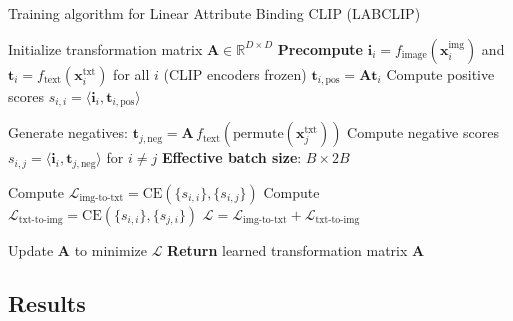 \begin{algorithm}
\small 
\caption{\small Training algorithm for Linear Attribute Binding CLIP (LABCLIP)}
\begin{algorithmic}[1]
\State Initialize transformation matrix $\mathbf{A} \in \mathbb{R}^{D \times D}$
\State \textbf{Precompute} $\mathbf{i}_i = f_{\text{image}}(\mathbf{x}_i^{\text{img}})$ and $\mathbf{t}_i = f_{\text{text}}(\mathbf{x}_i^{\text{txt}})$ for all $i$ (CLIP encoders frozen)
    \State $\mathbf{t}_{i,\text{pos}} = \mathbf{A} \mathbf{t}_i$
    \State Compute positive scores $s_{i,i} = \langle \mathbf{i}_i, \mathbf{t}_{i,\text{pos}} \rangle$
    
      \State Generate negatives: $\mathbf{t}_{j,\text{neg}} = \mathbf{A} \, f_{\text{text}}(\text{permute}(\mathbf{x}_j^{\text{txt}}))$
      \State Compute negative scores $s_{i,j} = \langle \mathbf{i}_i, \mathbf{t}_{j,\text{neg}} \rangle$ for $i \neq j$
      \State \textbf{Effective batch size}: $B \times 2B$
    \EndIf

    \State Compute $\mathcal{L}_{\text{img-to-txt}} = \text{CE}(\{s_{i,i}\}, \{s_{i,j}\})$
    \State Compute $\mathcal{L}_{\text{txt-to-img}} = \text{CE}(\{s_{i,i}\}, \{s_{j,i}\})$
    \State $\mathcal{L} = \mathcal{L}_{\text{img-to-txt}} + \mathcal{L}_{\text{txt-to-img}}$
    
    \State Update $\mathbf{A}$ to minimize $\mathcal{L}$
  \EndFor
\EndFor
\State \textbf{Return} learned transformation matrix $\mathbf{A}$
\end{algorithmic}\label{algo:labclip}
\end{algorithm}









\subsection{Results}

